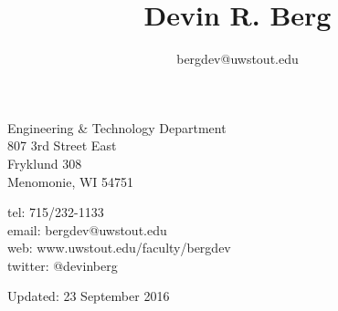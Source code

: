 \documentclass[10pt]{article}
\title{\bfseries\Huge Devin R. Berg}
\author{bergdev@uwstout.edu}
\date{}
\begin{document}
\maketitle
\vspace{1em}
\begin{minipage}[ht]{0.48\textwidth}
Engineering \& Technology Department\\
807 3rd Street East\\
Fryklund 308\\
Menomonie, WI 54751
\end{minipage}
\begin{minipage}[ht]{0.48\textwidth}
\begin{flushright}
tel: 715/232-1133\\
email: bergdev@uwstout.edu\\
web: www.uwstout.edu/faculty/bergdev\\
twitter: @devinberg
\end{flushright}
\end{minipage}
\vspace{20pt}


































\vspace{20pt}
\vspace{20pt}
\scriptsize\hfill Updated: 23 September 2016
\end{document}
